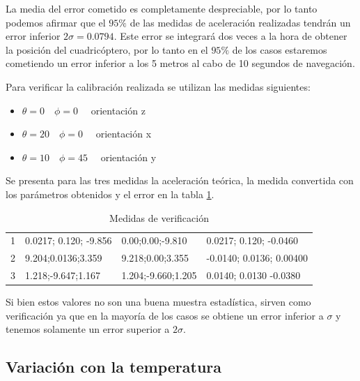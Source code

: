 \documentclass[main]{subfiles}
\begin{document}
La media del error cometido es completamente despreciable, por lo tanto podemos afirmar que el $95\% $ de las medidas de aceleración realizadas tendrán un error inferior $2\sigma=0.0794$. Este error se integrará dos veces a la hora de obtener la posición del cuadricóptero, por lo tanto en el $95 \%$ de los casos estaremos cometiendo un error inferior a los 5 metros al cabo de 10 segundos de navegación. 
 
Para verificar la calibración realizada se utilizan las medidas siguientes:
\begin{itemize}
\item $\theta = 0 \quad \phi = 0 \quad$ orientación z
\item $\theta = 20 \quad \phi = 0 \quad$ orientación x
\item $\theta = 10 \quad \phi = 45 \quad$ orientación y
\end{itemize}

Se presenta para las tres medidas la aceleración teórica, la medida convertida con los parámetros obtenidos y el error en la tabla \ref{tab:diff}. 

\begin{table}[H]
\centering
\begin{tabular}{|p{90pt}|p{90pt}|p{90pt}|p{90pt}|}
\hline
\cellcolor[gray]{0.8}{Medida} & \cellcolor[gray]{0.8}{Aceleración Medida ($ms^{-2}$)}&\cellcolor[gray]{0.8}{Aceleración teórica($m^{-2}$)}& \cellcolor[gray]{0.8}{Error($ms^{-2}$)} \\
\hline
1 &  0.0217; 0.120; -9.856   & 0.00;0.00;-9.810     & 0.0217; 0.120; -0.0460\\
\hline
2 & 9.204;0.0136;3.359       & 9.218;0.00;3.355     & -0.0140; 0.0136; 0.00400\\
\hline
3 & 1.218;-9.647;1.167       & 1.204;-9.660;1.205   & 0.0140; 0.0130 -0.0380\\
\hline
\end{tabular}
\caption{Medidas de verificación}
\label{tab:diff}
\end{table}

Si bien estos valores no son una buena muestra estadística, sirven como verificación ya que en la mayoría de los casos se obtiene un error inferior a $\sigma$ y tenemos solamente un error superior a $2\sigma$.

\subsection{Variación con la temperatura}
\end{document}
